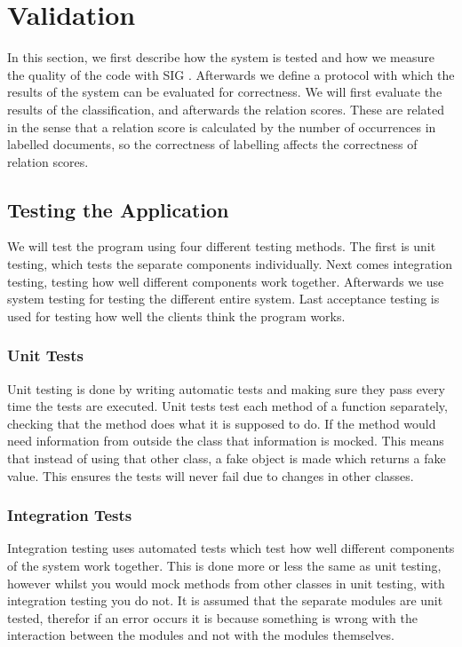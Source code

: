 \section{Validation}
In this section, we first describe how the system is tested and how we measure the quality of the code with SIG \cite{sig}. Afterwards we define a protocol with which the results of the system can be evaluated for correctness. We will first evaluate the results of the classification, and afterwards the relation scores. These are related in the sense that a relation score is calculated by the number of occurrences in labelled documents, so the correctness of labelling affects the correctness of relation scores.\\

\subsection{Testing the Application}
We will test the program using four different testing methods. The first is unit testing, which tests the separate components individually. Next comes integration testing, testing how well different components work together. Afterwards we use system testing for testing the different entire system. Last acceptance testing is used for testing how well the clients think the program works.

\subsubsection{Unit Tests}
Unit testing is done by writing automatic tests and making sure they pass every time the tests are executed. Unit tests test each method of a function separately, checking that the method does what it is supposed to do. If the method would need information from outside the class that information is mocked. This means that instead of using that other class, a fake object is made which returns a fake value. This ensures the tests will never fail due to changes in other classes.

\subsubsection{Integration Tests}
Integration testing uses automated tests which test how well different components of the system work together. This is done more or less the same as unit testing, however whilst you would mock methods from other classes in unit testing, with integration testing you do not. It is assumed that the separate modules are unit tested, therefor if an error occurs it is because something is wrong with the interaction between the modules and not with the modules themselves. 


